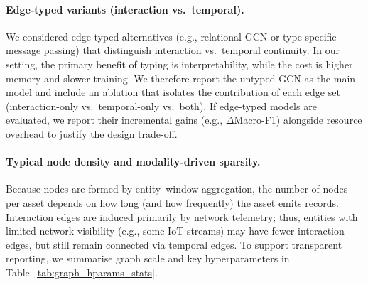 \documentclass[pdflatex,sn-mathphys-num]{sn-jnl}
\theoremstyle{thmstyleone}%
\theoremstyle{thmstyletwo}%
\theoremstyle{thmstylethree}%
\begin{document}
\paragraph{Edge-typed variants (interaction vs.\ temporal).}
We considered edge-typed alternatives (e.g., relational GCN or type-specific message passing) that distinguish interaction vs.\ temporal continuity. In our setting, the primary benefit of typing is interpretability, while the cost is higher memory and slower training. We therefore report the untyped GCN as the main model and include an ablation that isolates the contribution of each edge set (interaction-only vs.\ temporal-only vs.\ both). If edge-typed models are evaluated, we report their incremental gains (e.g., $\Delta$Macro-F1) alongside resource overhead to justify the design trade-off.


\paragraph{Typical node density and modality-driven sparsity.}
Because nodes are formed by entity--window aggregation, the number of nodes per asset depends on how long (and how frequently) the asset emits records.
Interaction edges are induced primarily by network telemetry; thus, entities with limited network visibility (e.g., some IoT streams) may have fewer interaction edges,
but still remain connected via temporal edges.
To support transparent reporting, we summarise graph scale and key hyperparameters in Table~\ref{tab:graph_hparams_stats}.
\end{document}
